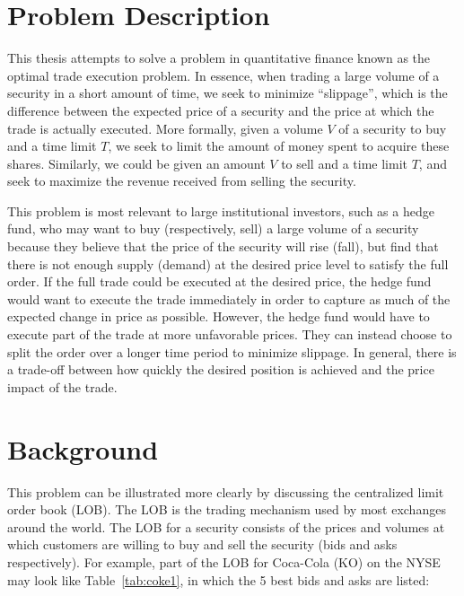 \section{Problem Description} \label{ch:problemdescription}

This thesis attempts to solve a problem in quantitative finance known as the optimal trade execution problem. In essence, when trading a large volume of a security in a short amount of time, we seek to minimize “slippage”, which is the difference between the expected price of a security and the price at which the trade is actually executed. More formally, given a volume $V$ of a security to buy and a time limit $T$, we seek to limit the amount of money spent to acquire these shares. Similarly, we could be given an amount $V$ to sell and a time limit $T$, and seek to maximize the revenue received from selling the security. 

This problem is most relevant to large institutional investors, such as a hedge fund, who may want to buy (respectively, sell) a large volume of a security because they believe that the price of the security will rise (fall), but find that there is not enough supply (demand) at the desired price level to satisfy the full order. If the full trade could be executed at the desired price, the hedge fund would want to execute the trade immediately in order to capture as much of the expected change in price as possible. However, the hedge fund would have to execute part of the trade at more unfavorable prices. They can instead choose to split the order over a longer time period to minimize slippage. In general, there is a trade-off between how quickly the desired position is achieved and the price impact of the trade.


\section{Background} \label{ch:background}
This problem can be illustrated more clearly by discussing the centralized limit order book (LOB). The LOB is the trading mechanism used by most exchanges around the world. The LOB for a security consists of the prices and volumes at which customers are willing to buy and sell the security (bids and asks respectively). For example, part of the LOB for Coca-Cola (KO) on the NYSE may look like Table~\ref{tab:coke1}, in which the 5 best bids and asks are listed:

